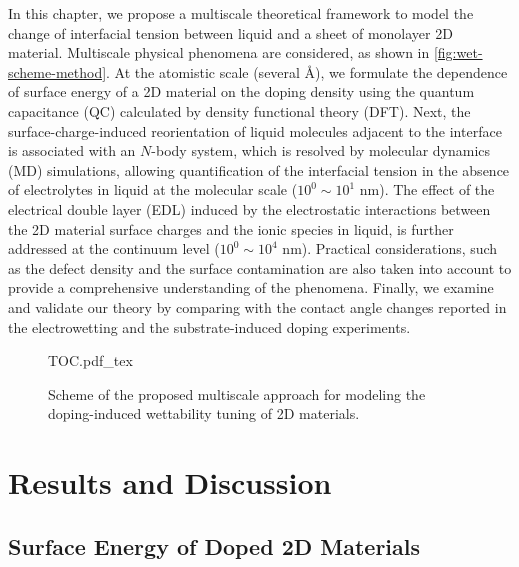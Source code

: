 In this chapter, we propose a multiscale theoretical framework to model
the change of interfacial tension between liquid and a sheet of
monolayer 2D material.
%
Multiscale physical phenomena are considered,
as shown in \autoref{fig:wet-scheme-method}. At the atomistic scale
(several \AA{}), we formulate the dependence of surface energy of a 2D
material on the doping density using the quantum capacitance (QC)
calculated by density functional theory (DFT). Next, the
surface-charge-induced reorientation of liquid molecules adjacent to
the interface is associated with an $N$-body system, which is resolved
by molecular dynamics (MD) simulations, allowing quantification of the
interfacial tension in the absence of electrolytes in liquid at the
molecular scale (\(10^{0} \sim 10^{1}\) nm).
%
The effect of the electrical
double layer (EDL) induced by the electrostatic interactions between
the 2D material surface charges and the ionic species in liquid, is
further addressed at the continuum level (\(10^{0} \sim 10^{4}\) nm).
%
Practical
considerations, such as the defect density and the surface
contamination are also taken into account to provide a comprehensive
understanding of the phenomena. Finally, we examine and validate our
theory by comparing with the contact angle changes reported in the
electrowetting and the substrate-induced doping experiments.

\begin{figure}[htbp]
  \centering
  {TOC.pdf_tex}
  \caption{\label{fig:wet-scheme-method} Scheme of the proposed
    multiscale approach for modeling the doping-induced wettability
    tuning of 2D materials. }
\end{figure}

\section{Results and Discussion}
\label{sec:wet-results}

\subsection{Surface Energy of Doped 2D Materials}
\label{sec:wet-gamma-doped}

